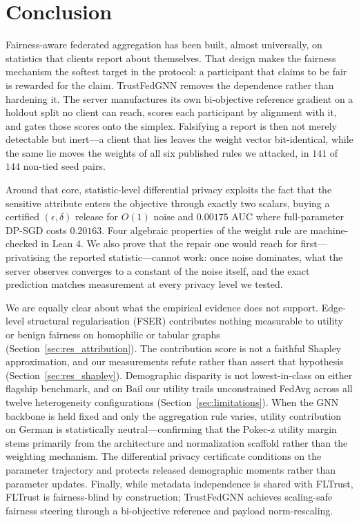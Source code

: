 \documentclass[preprint,12pt]{elsarticle}
\theoremstyle{plain}
\theoremstyle{definition}
\theoremstyle{remark}
\begin{document}
\section{Conclusion}
\label{sec:conclusion}

Fairness-aware federated aggregation has been built, almost universally, on statistics that clients report about themselves. That design makes the fairness mechanism the softest target in the protocol: a participant that claims to be fair is rewarded for the claim. TrustFedGNN removes the dependence rather than hardening it. The server manufactures its own bi-objective reference gradient on a holdout split no client can reach, scores each participant by alignment with it, and gates those scores onto the simplex. Falsifying a report is then not merely detectable but inert---a client that lies leaves the weight vector bit-identical, while the same lie moves the weights of all six published rules we attacked, in $141$ of $144$ non-tied seed pairs.

Around that core, statistic-level differential privacy exploits the fact that the sensitive attribute enters the objective through exactly two scalars, buying a certified $(\epsilon,\delta)$ release for $O(1)$ noise and $0.00175$ AUC where full-parameter DP-SGD costs $0.20163$. Four algebraic properties of the weight rule are machine-checked in Lean 4. We also prove that the repair one would reach for first---privatising the reported statistic---cannot work: once noise dominates, what the server observes converges to a constant of the noise itself, and the exact prediction matches measurement at every privacy level we tested.

We are equally clear about what the empirical evidence does not support. Edge-level structural regularisation (FSER) contributes nothing measurable to utility or benign fairness on homophilic or tabular graphs (Section~\ref{sec:res_attribution}). The contribution score is not a faithful Shapley approximation, and our measurements refute rather than assert that hypothesis (Section~\ref{sec:res_shapley}). Demographic disparity is not lowest-in-class on either flagship benchmark, and on Bail our utility trails unconstrained FedAvg across all twelve heterogeneity configurations (Section~\ref{sec:limitations}). When the GNN backbone is held fixed and only the aggregation rule varies, utility contribution on German is statistically neutral---confirming that the Pokec-z utility margin stems primarily from the architecture and normalization scaffold rather than the weighting mechanism. The differential privacy certificate conditions on the parameter trajectory and protects released demographic moments rather than parameter updates. Finally, while metadata independence is shared with FLTrust, FLTrust is fairness-blind by construction; TrustFedGNN achieves scaling-safe fairness steering through a bi-objective reference and payload norm-rescaling.
\end{document}
